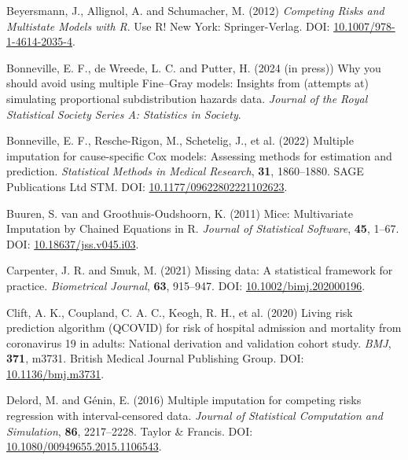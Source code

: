 \documentclass[
  letterpaper,
  DIV=11,
  numbers=noendperiod]{scrreprt}
\newlength{\cslhangindent}
\newlength{\cslentryspacingunit} %
\newenvironment{CSLReferences}[2] %
 {%
  \setlength{\parindent}{0pt}
  \ifodd #1
  \let\oldpar\par
  \def\par{\hangindent=\cslhangindent\oldpar}
  \fi
  \setlength{\parskip}{#2\cslentryspacingunit}
 }%
 {}
\begin{document}
\begin{CSLReferences}{1}{0}
\leavevmode{}%
Beyersmann, J., Allignol, A. and Schumacher, M. (2012) \emph{Competing
{Risks} and {Multistate Models} with {R}}. Use {R}! New York:
Springer-Verlag. DOI:
\href{https://doi.org/10.1007/978-1-4614-2035-4}{10.1007/978-1-4614-2035-4}.

\leavevmode{}%
Bonneville, E. F., de Wreede, L. C. and Putter, H. (2024 (in press)) Why
you should avoid using multiple {Fine}--{Gray} models: Insights from
(attempts at) simulating proportional subdistribution hazards data.
\emph{Journal of the Royal Statistical Society Series A: Statistics in
Society}.

\leavevmode{}%
Bonneville, E. F., Resche-Rigon, M., Schetelig, J., et al. (2022)
Multiple imputation for cause-specific {Cox} models: {Assessing} methods
for estimation and prediction. \emph{Statistical Methods in Medical
Research}, \textbf{31}, 1860--1880. SAGE Publications Ltd STM. DOI:
\href{https://doi.org/10.1177/09622802221102623}{10.1177/09622802221102623}.

\leavevmode{}%
Buuren, S. van and Groothuis-Oudshoorn, K. (2011) Mice: {Multivariate
Imputation} by {Chained Equations} in {R}. \emph{Journal of Statistical
Software}, \textbf{45}, 1--67. DOI:
\href{https://doi.org/10.18637/jss.v045.i03}{10.18637/jss.v045.i03}.

\leavevmode{}%
Carpenter, J. R. and Smuk, M. (2021) Missing data: {A} statistical
framework for practice. \emph{Biometrical Journal}, \textbf{63},
915--947. DOI:
\href{https://doi.org/10.1002/bimj.202000196}{10.1002/bimj.202000196}.

\leavevmode{}%
Clift, A. K., Coupland, C. A. C., Keogh, R. H., et al. (2020) Living
risk prediction algorithm ({QCOVID}) for risk of hospital admission and
mortality from coronavirus 19 in adults: National derivation and
validation cohort study. \emph{BMJ}, \textbf{371}, m3731. British
Medical Journal Publishing Group. DOI:
\href{https://doi.org/10.1136/bmj.m3731}{10.1136/bmj.m3731}.

\leavevmode{}%
Delord, M. and Génin, E. (2016) Multiple imputation for competing risks
regression with interval-censored data. \emph{Journal of Statistical
Computation and Simulation}, \textbf{86}, 2217--2228. Taylor \& Francis.
DOI:
\href{https://doi.org/10.1080/00949655.2015.1106543}{10.1080/00949655.2015.1106543}.


\end{CSLReferences}
\end{document}
